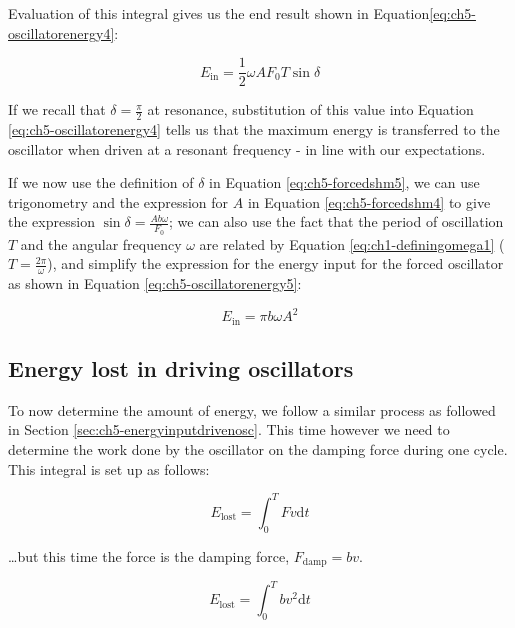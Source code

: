 \documentclass[
]{book}
\begin{document}
Evaluation of this integral gives us the end result shown in Equation\eqref{eq:ch5-oscillatorenergy4}:

\begin{equation}
E_{\mathrm{in}} = \frac{1}{2}\omega A F_0 T \sin \delta
\label{eq:ch5-oscillatorenergy4}
\end{equation}

If we recall that \(\delta = \frac{\pi}{2}\) at resonance, substitution of this value into Equation \eqref{eq:ch5-oscillatorenergy4} tells us that the maximum energy is transferred to the oscillator when driven at a resonant frequency - in line with our expectations.

If we now use the definition of \(\delta\) in Equation \eqref{eq:ch5-forcedshm5}, we can use trigonometry and the expression for \(A\) in Equation \eqref{eq:ch5-forcedshm4} to give the expression \(\sin \delta = \frac{Ab\omega}{F_0}\); we can also use the fact that the period of oscillation \(T\) and the angular frequency \(\omega\) are related by Equation \eqref{eq:ch1-definingomega1} (\(T = \frac{2\pi}{\omega}\)), and simplify the expression for the energy input for the forced oscillator as shown in Equation \eqref{eq:ch5-oscillatorenergy5}:

\begin{equation}
E_{\mathrm{in}} = \pi b \omega A^2
\label{eq:ch5-oscillatorenergy5}
\end{equation}

\hypertarget{sec:ch5-energylostdrivenosc}{%
\subsection{Energy lost in driving oscillators}\label{sec:ch5-energylostdrivenosc}}

To now determine the amount of energy, we follow a similar process as followed in Section \ref{sec:ch5-energyinputdrivenosc}. This time however we need to determine the work done by the oscillator on the damping force during one cycle. This integral is set up as follows:

\begin{equation}
E_{\mathrm{lost}} = \int_0^T F v \mathrm{d}t
\end{equation}

\ldots but this time the force is the damping force, \(F_{\mathrm{damp}} = bv\).

\begin{equation}
E_{\mathrm{lost}} = \int_0^T b v^2 \mathrm{d}t
\end{equation}
\end{document}
